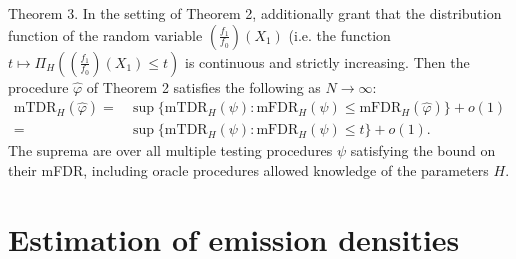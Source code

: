 \documentclass[10pt, aspectratio=169]{beamer}
\begin{document}
\begin{frame}
   \begin{mytheorembox}{Theorem 3.}
        In the setting of Theorem 2, additionally grant that the distribution function of the
        random variable \( \left( \frac{f_1}{f_0} \right) (X_1) \) (i.e. the function \( t \mapsto \Pi_H \left( \left( \frac{f_1}{f_0} \right) (X_1) \leq t \right) \) is continuous and strictly
        increasing. Then the procedure \( \hat{\varphi} \) of Theorem 2 satisfies the following as \( N \to \infty \):
        \begin{equation*}
            \begin{split}
            \text{mTDR}_H(\hat{\varphi}) = &\sup \{ \text{mTDR}_H(\psi) : \text{mFDR}_H(\psi) \leq \text{mFDR}_H(\hat{\varphi}) \} + o(1) \\
            = &\sup \{ \text{mTDR}_H(\psi) : \text{mFDR}_H(\psi) \leq t \} + o(1).
            \end{split}
        \end{equation*}
        The suprema are over all multiple testing procedures \( \psi \) satisfying the bound on their mFDR, including
        oracle procedures allowed knowledge of the parameters \( H \).
    \end{mytheorembox}
\end{frame}
\section[Estimation of Emission Densities]{Estimation of emission densities}
\begin{frame}
   
\end{frame}
\begin{frame}
   
\end{frame}
\begin{frame}
   
\end{frame}
\begin{frame}
   
\end{frame}
\begin{frame}
   
\end{frame}
\begin{frame}
   
\end{frame}
\end{document}
